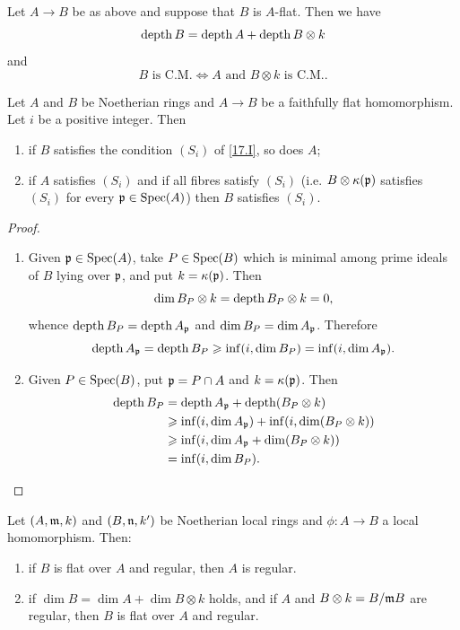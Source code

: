 \documentclass[../main]{subfiles}
\begin{document}
\begin{parcorollary}
Let $A \longrightarrow B$ be as above and suppose that $B$ is $A$-flat. Then we have
\[
\operatorname{depth} B = \operatorname{depth} A + \operatorname{depth} B \otimes k
\]
and
\[
B \text { is C.M.}\iff A \text { and } B \otimes k \text { is C.M..}
\]
\end{parcorollary}

\begin{corollary}
Let $A$ and $B$ be Noetherian rings and $A \longrightarrow B$ be a faithfully flat homomorphism. Let $i$ be a positive integer. Then
\begin{enumerate}[label=(\arabic*)]
    \item if $B$ satisfies the condition $(S_i)$ of \ref{17.I}, so does $A$;
    \item if $A$ satisfies $(S_i)$ and if all fibres satisfy $(S_i)$ (i.e. $B \otimes \kappa(\mathfrak{p})$ satisfies $(S_i)$ for every $\mathfrak{p} \in \operatorname{Spec}(A)$) then $B$ satisfies $(S_i)$. 
\end{enumerate}
\end{corollary}

\begin{proof}
\begin{enumerate}[label=(\arabic*)]
    \item Given $\mathfrak{p} \in \operatorname{Spec}(A)$, take $P\in\operatorname{Spec}(B)$ which is minimal among prime ideals of $B$ lying over $\mathfrak{p}$, and put $k = \kappa(\mathfrak{p})$. Then \[\operatorname{dim} B_P \otimes k = \operatorname{depth} B_P \otimes k = 0,\] whence $\operatorname{depth} B_P = \operatorname{depth} A_{\mathfrak{p}}$ and $\operatorname{dim} B_P = \operatorname{dim} A_{\mathfrak{p}}$. Therefore \[\operatorname{depth} A_{\mathfrak{p}} = \operatorname{depth} B_P \geqslant \inf (i, \operatorname{dim} B_P) = \inf(i, \operatorname{dim} A_{\mathfrak{p}}).\]
    \item Given $P \in \operatorname{Spec}(B)$, put $\mathfrak{p} = P \cap A$ and $k = \kappa(\mathfrak{p})$. Then
    \begin{align*}
    \operatorname{depth} B_P & = \operatorname{depth} A_{\mathfrak{p}} + \operatorname{depth} (B_P \otimes k) \\ & \geqslant \inf(i, \operatorname{dim} A_{\mathfrak{p}}) + \inf(i, \operatorname{dim} (B_P \otimes k)) \\ & \geqslant \inf(i, \operatorname{dim} A_{\mathfrak{p}} + \operatorname{dim}(B_P \otimes k)) \\ & = \inf(i, \operatorname{dim} B_P).
    \end{align*}
\end{enumerate}
\end{proof}

\begin{partheorem}\label{thm:051}
Let $(A, \mathfrak{m}, k)$ and $(B, \mathfrak{n}, k')$ be Noetherian local rings and $\phi : A \longrightarrow B$ a local homomorphism. Then: 

\begin{enumerate}
    \item if $B$ is flat over $A$ and regular, then $A$ is regular.
    \item if $\dim B = \dim A + \dim B \otimes k$ holds, and if $A$ and $B \otimes k = B/\mathfrak{m} B$ are regular, then $B$ is flat over $A$ and regular.
\end{enumerate}
\end{partheorem}
\end{document}
